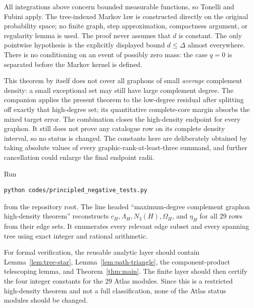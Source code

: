 \documentclass[11pt]{article}
\begin{document}
All integrations above concern bounded measurable functions, so Tonelli and
Fubini apply.  The tree-indexed Markov law is constructed directly on the
original probability space; no finite graph, step approximation, compactness
argument, or regularity lemma is used.  The proof never assumes that $d$ is
constant.  The only pointwise hypothesis is the explicitly displayed bound
$d\leq\Delta$ almost everywhere.  There is no conditioning on an event of
possibly zero mass: the case $q=0$ is separated before the Markov kernel is
defined.

This theorem by itself does not cover all graphons of small \emph{average}
complement density: a small exceptional set may still have large complement
degree.  The companion
 applies the present
theorem to the low-degree residual after splitting off exactly that
high-degree set; its quantitative complete-core margin absorbs the mixed
target error.  The combination closes the high-density endpoint for every
graphon.  It still does not prove any catalogue row on its complete density
interval, so no status is changed.  The constants here are deliberately
obtained by taking absolute values of every graphic-rank-at-least-three
summand, and further cancellation could enlarge the final endpoint radii.

Run
\begin{verbatim}
python codes/principled_negative_tests.py
\end{verbatim}
from the repository root.  The line headed
``maximum-degree complement graphon high-density theorem'' reconstructs
$c_H,\Lambda_H,N_3(H),\Omega_H$, and $\eta_H$ for all $29$ rows from their
edge sets.  It enumerates every relevant edge subset and every spanning tree
using exact integer and rational arithmetic.

For formal verification, the reusable analytic layer should contain
Lemma~\ref{lem:tree-star}, Lemma~\ref{lem:path-triangle}, the component-product
telescoping lemma, and Theorem~\ref{thm:main}.  The finite layer should then
certify the four integer constants for the $29$ Atlas modules.  Since this is
a restricted high-density theorem and not a full classification, none of the
Atlas status modules should be changed.
\end{document}
